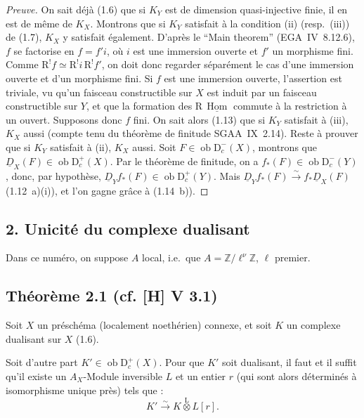\documentclass[11pt]{article}
\DeclareMathOperator{\Hom}{Hom}
\newcommand{\R}{\mathrm{R}}
\newcommand{\D}{\mathrm{D}}
\newcommand{\Z}{\mathbb{Z}}
\newcommand{\ob}{\operatorname{ob}}
\providecommand{\Hom}{\operatorname{Hom}}
\providecommand{\ob}{\operatorname{ob}}
\providecommand{\R}{\mathrm R}
\providecommand{\Z}{\mathbb Z}
\providecommand{\Hom}{\operatorname{Hom}}
\begin{document}
\begin{proof}[Preuve]
On sait déjà (1.6) que si $K_Y$ est de dimension quasi-injective finie, il en est de même de $K_X$. Montrons que si $K_Y$ satisfait à la condition (ii) (resp.~(iii)) de (1.7), $K_X$ y satisfait également. D'après le ``Main theorem'' (EGA~IV~8.12.6), $f$ se factorise en $f = f'i$, où $i$ est une immersion ouverte et $f'$ un morphisme fini. Comme $\R^{!}f \simeq \R^{!}i \, \R^{!}f'$, on doit donc regarder séparément le cas d'une immersion ouverte et d'un morphisme fini. Si $f$ est une immersion ouverte, l'assertion est triviale, vu qu'un faisceau constructible sur $X$ est induit par un faisceau constructible sur $Y$, et que la formation des $\R\,\underline{\Hom}$ commute à la restriction à un ouvert. Supposons donc $f$ fini. On sait alors (1.13) que si $K_Y$ satisfait à (iii), $K_X$ aussi (compte tenu du théorème de finitude SGAA~IX~2.14). Reste à prouver que si $K_Y$ satisfait à (ii), $K_X$ aussi. Soit $F \in \ob \D_c^{-}(X)$, montrons que $\underline{D}_X(F) \in \ob \D_c^{+}(X)$. Par le théorème de finitude, on a $f_{*}(F) \in \ob \D_c^{-}(Y)$, donc, par hypothèse, $\underline{D}_Y f_{*}(F) \in \ob \D_c^{+}(Y)$. Mais $\underline{D}_Y f_{*}(F) \xrightarrow{\sim} f_{*}\underline{D}_X(F)$ (1.12~a)(i)), et l'on gagne grâce à (1.14~b)).
\end{proof}

\subsection{2. Unicité du complexe dualisant}

Dans ce numéro, on suppose $A$ local, i.e.~que $A = \Z/\ell^{\nu}\Z$, $\ell$ premier.

\subsection*{Théorème 2.1 (cf. [H] V 3.1)}
Soit $X$ un préschéma (localement noethérien) connexe, et soit $K$ un complexe dualisant sur $X$ (1.6).

Soit d'autre part $K' \in \ob \D_c^{+}(X)$. Pour que $K'$ soit dualisant, il faut et il suffit qu'il existe un $A_X$-Module inversible $L$ et un entier $r$ (qui sont alors déterminés à isomorphisme unique près) tels que :
\[
K' \xrightarrow{\sim} K \mathop{\otimes}\limits^{\mathrm{L}} L[r].
\]
\end{document}
